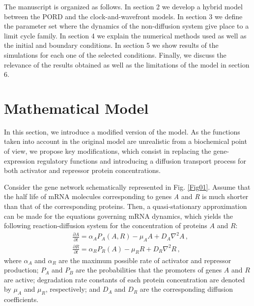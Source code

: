 \documentclass[11pt]{article}
\begin{document}
	The manuscript is organized as follows. In section 2 we develop a hybrid
	model between the PORD and the clock-and-wavefront models. In section 3 we 
	define the parameter set where the dynamics of the non-diffusion system give place 
	to a limit cycle family. In section 4 we explain the numerical methods used as 
	well as the initial and boundary conditions. In section 5 we show results of the
	simulations for each one of the selected conditions. Finally, we discuss the 
	relevance of the results obtained as well as the limitations of the model in 
	section 6.
	
	\section{Mathematical Model}
	\label{model}
	
	In this section, we introduce a modified version of the
	\citeauthor{Cotterell2015} model. As the functions taken into account in the
	original model are unrealistic from a biochemical point of view, we propose key
	modifications, which consist in replacing the gene-expression regulatory
	functions and introducing a diffusion transport process for both activator and
	repressor protein concentrations.
	
	Consider the gene network schematically represented in Fig. \ref{Fig01}. Assume
	that the half life of mRNA molecules corresponding to genes \textit{A} and
	\textit{R} is much shorter than that of the corresponding proteins. Then, a
	quasi-stationary approximation can be made for the equations governing mRNA
	dynamics, which yields the following reaction-diffusion system for the concentration of
	proteins $A$ and $R$:
	\begin{subequations}\label{eq012}
		\begin{flalign}
		& \frac{\partial A}{\partial t} = \alpha_A P_A (A, R) - \mu_A A + D_A \nabla^2 A\,,
		\label{eq01} \\
		& \frac{\partial R}{\partial t} = \alpha_R P_R (A) - \mu_R R + D_R \nabla^2 R\,,
		\label{eq02}
		\end{flalign}
	\end{subequations}
	where $\alpha_A$ and $\alpha_R$ are the maximum possible rate of activator and
	repressor production; $P_A$ and $P_B$ are the probabilities that the promoters
	of genes $A$ and $R$ are active; degradation rate constants of each protein
	concentration are denoted by $\mu_A$ and $\mu_R$, respectively; and $D_A$ and
	$D_R$ are the corresponding diffusion coefficients.
	
\end{document}
